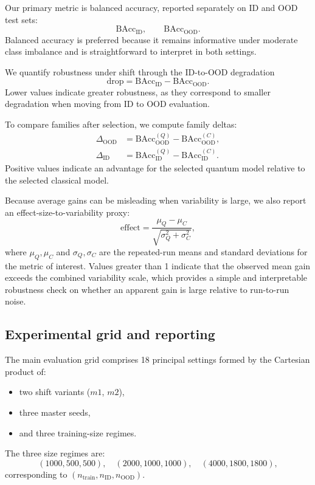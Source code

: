 \documentclass[pdflatex,sn-mathphys-num]{sn-jnl}%
\theoremstyle{thmstyleone}%
\theoremstyle{thmstyletwo}%
\theoremstyle{thmstylethree}%
\begin{document}
Our primary metric is balanced accuracy, reported separately on ID and OOD test sets:
\[
\mathrm{BAcc}_{\mathrm{ID}}, \qquad \mathrm{BAcc}_{\mathrm{OOD}}.
\]
Balanced accuracy is preferred because it remains informative under moderate class imbalance and is straightforward to interpret in both settings.

We quantify robustness under shift through the ID-to-OOD degradation
\[
\mathrm{drop} = \mathrm{BAcc}_{\mathrm{ID}} - \mathrm{BAcc}_{\mathrm{OOD}}.
\]
Lower values indicate greater robustness, as they correspond to smaller degradation when moving from ID to OOD evaluation.

To compare families after selection, we compute family deltas:
\begin{align}
\Delta_{\mathrm{OOD}} &= \mathrm{BAcc}^{(Q)}_{\mathrm{OOD}} - \mathrm{BAcc}^{(C)}_{\mathrm{OOD}},\\
\Delta_{\mathrm{ID}}  &= \mathrm{BAcc}^{(Q)}_{\mathrm{ID}}  - \mathrm{BAcc}^{(C)}_{\mathrm{ID}}.
\end{align}
Positive values indicate an advantage for the selected quantum model relative to the selected classical model.

Because average gains can be misleading when variability is large, we also report an effect-size-to-variability proxy:
\[
\mathrm{effect} =
\frac{\mu_Q - \mu_C}{\sqrt{\sigma_Q^2 + \sigma_C^2}},
\]
where $\mu_Q,\mu_C$ and $\sigma_Q,\sigma_C$ are the repeated-run means and standard deviations for the metric of interest. Values greater than 1 indicate that the observed mean gain exceeds the combined variability scale, which provides a simple and interpretable robustness check on whether an apparent gain is large relative to run-to-run noise.

\subsection{Experimental grid and reporting}

The main evaluation grid comprises 18 principal settings formed by the Cartesian product of:
\begin{itemize}
    \item two shift variants ($m1$, $m2$),
    \item three master seeds,
    \item and three training-size regimes.
\end{itemize}
The three size regimes are:
\[
(1000, 500, 500),\quad (2000, 1000, 1000),\quad (4000, 1800, 1800),
\]
corresponding to $(n_{\mathrm{train}}, n_{\mathrm{ID}}, n_{\mathrm{OOD}})$.
\end{document}
